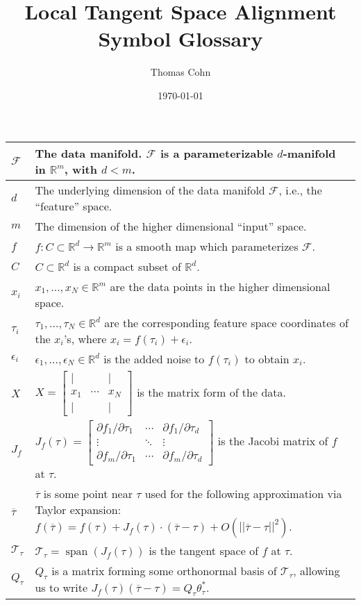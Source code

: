 \documentclass[10pt,letterpaper]{article}
\author{Thomas Cohn}
\title{Local Tangent Space Alignment Symbol Glossary}
\date{\today} %
\newcommand{\reals}{\mathbb{R}}
\newcommand{\R}{\reals}
\newcommand{\abs}[1]{\left|#1\right|}
\newcommand{\norm}[1]{\abs{\abs{#1}}}
\DeclareMathOperator{\vspan}{span}
\newcommand{\smallBMatrix}[1]{\brack{\begin{smallmatrix}#1\end{smallmatrix}}}
\newcommand{\Tau}{\mathcal{T}}
\renewcommand{\brack}[1]{\left[#1\right]}
\begin{document}
\maketitle
\setlength\RaggedRightParindent{\parindent}
\RaggedRight

\begin{tabularx}{\linewidth}{|l|>{\raggedright\arraybackslash}X|} \hline
	$\mathcal{F}$ & The data manifold. $\mathcal{F}$ is a parameterizable $d$-manifold in $\R^{m}$, with $d<m$.\\ \hline
	$d$ & The underlying dimension of the data manifold $\mathcal{F}$, i.e., the ``feature'' space.\\ \hline
	$m$ & The dimension of the higher dimensional ``input'' space.\\ \hline
	$f$ & $f:C\subset\R^{d}\to\R^{m}$ is a smooth map which parameterizes $\mathcal{F}$.\\ \hline
	$C$ & $C\subset\R^{d}$ is a compact subset of $\R^{d}$.\\ \hline
	$x_{i}$ & $x_{1},\ldots,x_{N}\in\R^{m}$ are the data points in the higher dimensional space.\\ \hline
	$\tau_{i}$ & $\tau_{1},\ldots,\tau_{N}\in\R^{d}$ are the corresponding feature space coordinates of the $x_{i}$'s, where $x_{i}=f(\tau_{i})+\epsilon_{i}$.\\ \hline
	$\epsilon_{i}$ & $\epsilon_{1},\ldots,\epsilon_{N}\in\R^{d}$ is the added noise to $f(\tau_{i})$ to obtain $x_{i}$.\\ \hline
	$X$ & $X=\smallBMatrix{| & & |\\ x_{1} & \cdots & x_{N}\\ | & & |}$ is the matrix form of the data.\\ \hline
	$J_{f}$ & $J_{f}(\tau)=\smallBMatrix{\partial{}f_{1}/\partial\tau_{1} & \cdots & \partial{}f_{1}/\partial\tau_{d}\\ \vdots & \ddots & \vdots\\ \partial{}f_{m}/\partial\tau_{1} & \cdots & \partial{}f_{m}/\partial\tau_{d}}$ is the Jacobi matrix of $f$ at $\tau$.\\ \hline
	$\overline{\tau}$ & $\overline{\tau}$ is some point near $\tau$ used for the following approximation via Taylor expansion: $f(\overline{\tau})=f(\tau)+J_{f}(\tau)\cdot(\overline{\tau}-\tau)+O(\norm{\overline{\tau}-\tau}^{2})$.\\ \hline
	$\Tau_{\tau}$ & $\Tau_{\tau}=\vspan(J_{f}(\tau))$ is the tangent space of $f$ at $\tau$.\\ \hline
	$Q_{\tau}$ & $Q_{\tau}$ is a matrix forming some orthonormal basis of $\Tau_{\tau}$, allowing us to write $J_{f}(\tau)(\overline{\tau}-\tau)=Q_{\tau}\theta_{\tau}^{*}$.\\ \hline

\end{tabularx}
\end{document}
